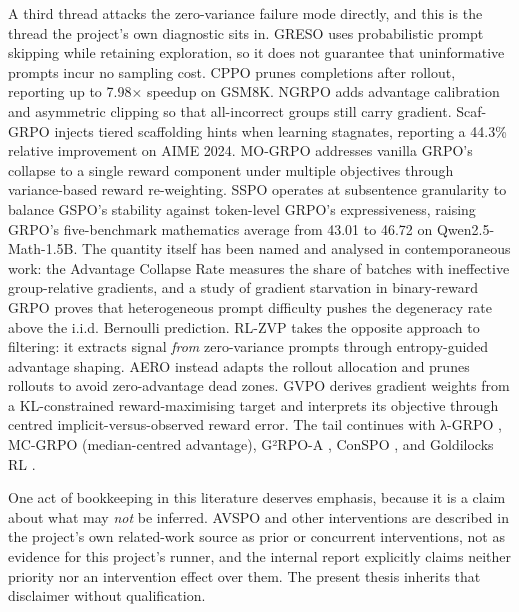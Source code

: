 \documentclass[12pt,a4paper]{report}
\begin{document}
A third thread attacks the zero-variance failure mode directly, and this
is the thread the project's own diagnostic sits in. GRESO
\citep{zheng2025greso} uses probabilistic prompt skipping while
retaining exploration, so it does not guarantee that uninformative
prompts incur no sampling cost. CPPO \citep{lin2025cppo} prunes
completions after rollout, reporting up to 7.98× speedup on GSM8K. NGRPO
\citep{nan2025ngrpo} adds advantage calibration and asymmetric clipping
so that all-incorrect groups still carry gradient. Scaf-GRPO
\citep{zhang2025scafgrpo} injects tiered scaffolding hints when learning
stagnates, reporting a 44.3\% relative improvement on AIME 2024. MO-GRPO
\citep{ichihara2025mogrpo} addresses vanilla GRPO's collapse to a single
reward component under multiple objectives through variance-based reward
re-weighting. SSPO \citep{yang2025sspo} operates at subsentence
granularity to balance GSPO's stability against token-level GRPO's
expressiveness, raising GRPO's five-benchmark mathematics average from
43.01 to 46.72 on Qwen2.5-Math-1.5B. The quantity itself has been named
and analysed in contemporaneous work: the Advantage Collapse Rate
\citep{he2026avspo} measures the share of batches with ineffective
group-relative gradients, and a study of gradient starvation in
binary-reward GRPO \citep{nie2026starvation} proves that heterogeneous
prompt difficulty pushes the degeneracy rate above the i.i.d. Bernoulli
prediction. RL-ZVP \citep{le2025rlzvp} takes the opposite approach to
filtering: it extracts signal \emph{from} zero-variance prompts through
entropy-guided advantage shaping. AERO \citep{zhang2026aero} instead
adapts the rollout allocation and prunes rollouts to avoid
zero-advantage dead zones. GVPO \citep{zhang2025gvpo} derives gradient
weights from a KL-constrained reward-maximising target and interprets
its objective through centred implicit-versus-observed reward error. The
tail continues with λ-GRPO \citep{wang2025lambdagrpo}, MC-GRPO
\citep{kim2026mcgrpo} (median-centred advantage), G²RPO-A
\citep{guo2025g2rpoa}, ConSPO \citep{zhang2026conspo}, and Goldilocks RL
\citep{mahrooghi2026goldilocks}.

One act of bookkeeping in this literature deserves emphasis, because it
is a claim about what may \emph{not} be inferred. AVSPO
\citep{he2026avspo} and other interventions are described in the
project's own related-work source as prior or concurrent interventions,
not as evidence for this project's runner, and the internal report
explicitly claims neither priority nor an intervention effect over them.
The present thesis inherits that disclaimer without qualification.
\end{document}
